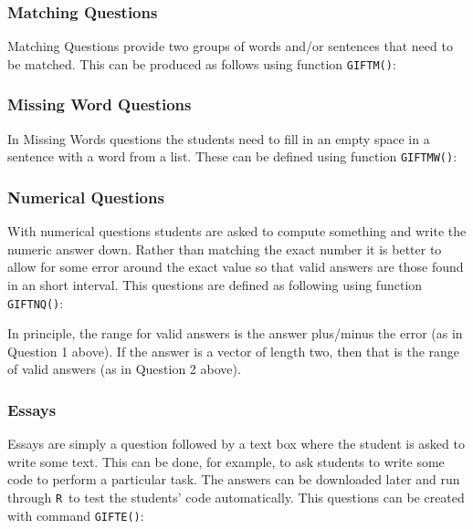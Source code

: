 \documentclass[a4paper]{article}
\newcommand{\RR}{\texttt{R}\ }
\newcommand{\code}[1]{\texttt{#1}}
\begin{document}
\subsubsection{Matching Questions}

Matching Questions provide two groups of words and/or sentences that need
to be matched. This can be produced as follows using function \code{GIFTM()}:



\subsubsection{Missing Word Questions}

In Missing Words questions the students need to fill in an empty space
in a sentence with a word from a list. These can be defined
using function \code{GIFTMW()}:






\subsubsection{Numerical Questions}

With  numerical questions students are asked to compute something and write the
numeric answer down. Rather than matching the exact number it is better to
allow for some error around the exact value so that valid answers are those
found in an short interval. This questions are defined as following using
function \code{GIFTNQ()}:





In principle, the range for valid answers is the answer plus/minus the error
(as in Question 1 above).  If the answer is a vector of length two, then that
is the range of valid answers (as in Question 2 above).

\subsubsection{Essays}

Essays are simply a question followed by a text box where the student is asked
to write some text. This can be done, for example, to ask students to write
some code to perform a particular task.  The answers can be downloaded later
and run through \RR to test the students' code automatically. This questions can
be created with command \code{GIFTE()}:
\end{document}
